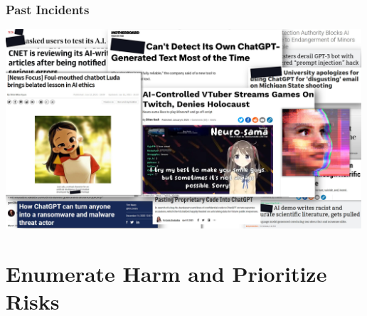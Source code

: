 \documentclass[11pt,
               aspectratio=169,
               hyperref={colorlinks}
               ]{beamer}
\begin{document}
		\begin{frame}
			
			\frametitle{Past Incidents}
			\centering
			\includegraphics[height=210pt]{../img/pastincidents.jpg}
								
		\end{frame}


	\section{Enumerate Harm and Prioritize Risks}
\end{document}
